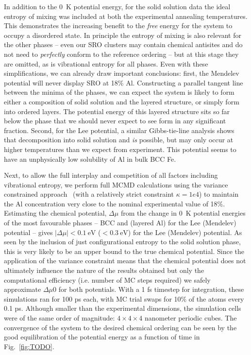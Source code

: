 In addition to the 0~K potential energy, for the solid solution data the ideal entropy of mixing was included at both the experimental annealing temperatures.
This demonstrates the increasing benefit to the \emph{free} energy for the system to occupy a disordered state.
In principle the entropy of mixing is also relevant for the other phases -- even our SRO clusters may contain chemical antisites and do not need to \emph{perfectly} conform to the reference ordering -- but at this stage they are omitted, as is vibrational entropy for all phases.
Even with these simplifications, we can already draw important conclusions: first, the Mendelev potential will never display \DOTHREE SRO at 18\% Al.
Constructing a parallel tangent line between the minima of the phases, we can expect the system is likely to form either a composition of solid solution and the layered structure, or simply form into ordered layers.
The potential energy of this layered structure sits so far below the \DOTHREE phase that we should never expect to see \DOTHREE form in any significant fraction.
Second, for the Lee potential, a similar Gibbs-tie-line analysis shows that decomposition into solid solution and \DOTHREE \emph{is} possible, but may only occur at higher temperatures than we expect from experiment.
This potential seems to have an unphysically low solubility of Al in bulk BCC Fe.

Next, to allow the full interplay and competition of all factors including vibrational entropy, we perform full MCMD calculations using the variance constrained approach~\cite{sadigh2012calculation, sadigh2012scalable} (with a relatively strict constraint $\kappa = 1e4$) to maintain the Al concentration very close to the nominal experimental value of 18\%.
Estimating the chemical potential, $\Delta \mu$ from the change in 0~K potential energies of the most favourable phases -- BCC and \DOTHREE (layered Al) for the Lee (Mendelev) potential -- gives $|\Delta \mu| < 0.1~\mathrm{eV}$ ($<0.3~\mathrm{eV}$) for the Lee (Mendelev) potential.
As seen by the inclusion of just configurational entropy to the solid solution phase, this is very likely to be an upper bound to the true chemical potential.
Since the application of the variance constraint means that the chemical potential does not ultimately influence the nature of the results obtained but only the computational efficiency (i.e. number of MC steps required) we safely approximate $\Delta \mu 0 $ for both potentials.
With a 1 fs timestep for integration, these simulations ran for 100 ps each, with MC trial swaps for 10\% of the atoms every 0.1 ps.
Although smaller than the experimental dimensions, the simulation cells were of the same order of magnitude: $4\times4\times4$ nanometer periodic cubes.
The convergence of the system to the desired chemical ordering can be seen by the good equilibration of the potential energy as a function of time in Fig.~\ref{fig:TODO}.


